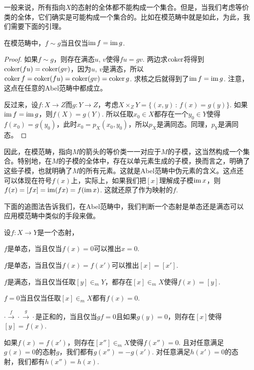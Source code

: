 一般来说，所有指向$X$的态射的全体都不能构成一个集合。但是，当我们考虑等价类的全体，它们确实是可能构成一个集合的。比如在模范畴中就是如此，为此，我们需要下面的引理。

\begin{lem}
在模范畴中，$f\sim g$当且仅当$\operatorname{im} f = \operatorname{im} g$.
\end{lem}

\begin{proof}
如果$f\sim g$，则存在满态$u$, $v$使得$fu=gv$. 两边求$\operatorname{coker}$将得到$\operatorname{coker}(fu)=\operatorname{coker}(gv)$，因为$u$, $v$是满态，所以$\operatorname{coker} f=\operatorname{coker}(fu)=\operatorname{coker}(gv)=\operatorname{coker} g$. 求核之后就得到了$\operatorname{im} f=\operatorname{im} g$. 注意，这点在任意的Abel范畴中都成立。

反过来，设$f:X\to Z$而$g:Y\to Z$，考虑$X\times_Z Y=\{(x,y)\,:\,f(x)=g(y)\}$. 如果$\operatorname{im} f=\operatorname{im} g$，则$f(X)=g(Y)$. 所以任取$x_0\in X$都存在一个$y_0\in Y$使得$f(x_0)=g(y_0)$，此时$x_0=p_X(x_0,y_0)$，所以$p_X$是满同态。同理，$p_Y$是满同态。
\end{proof}

因此，在模范畴，指向$M$的箭头的等价类一一对应于$M$的子模，这当然构成一个集合。特别地，在$M$的子模的全体中，存在以单元素生成的子模，换而言之，明确了这些子模，也就明确了$M$的所有元素。这就是Abel范畴中伪元素的含义。这点还可以体现在符号$f(x)$上，实际上，如果我们把$[x]$理解成子模$\operatorname{im} x$，则$f(x)=[fx]=\operatorname{im}(f x)=f(\operatorname{im} x)$. 这就还原了作为映射的$f$. 

下面的追图法告诉我们，在Abel范畴中，我们判断一个态射是单态还是满态可以应用模范畴中类似的手段来做。

\begin{pro}[追图法]
设$f:X\to Y$是一个态射，
\begin{compactenum}[~~~(1)]
\item $f$是单态，当且仅当$f(x)=0$可以推出$x=0$.
\item $f$是单态，当且仅当$f(x)=f(x')$可以推出$[x]=[x']$.
\item $f$是满态，当且仅当任取$[y]\in_m Y$，都存在$[x]\in_m X$使得$f(x)=[y]$.
\item $f=0$当且仅当任取$[x]\in_m X$都有$f(x)=0$.
\item $\cdot \xrightarrow{f} \cdot \xrightarrow{g}\cdot$是正和的，当且仅当$gf=0$且如果$g(y)=0$，则存在$[x]$使得$[y]=f(x)$.
\item 如果$f(x)=f(x')$，则存在$[x'']\in_m X$使得$f(x'')=0$. 且对任意满足$g(x)=0$的态射$g$，我们都有$g(x'')=-g(x')$. 对任意满足$h(x')=0$的态射，我们都有$h(x'')=h(x)$.
\end{compactenum}
\end{pro}

